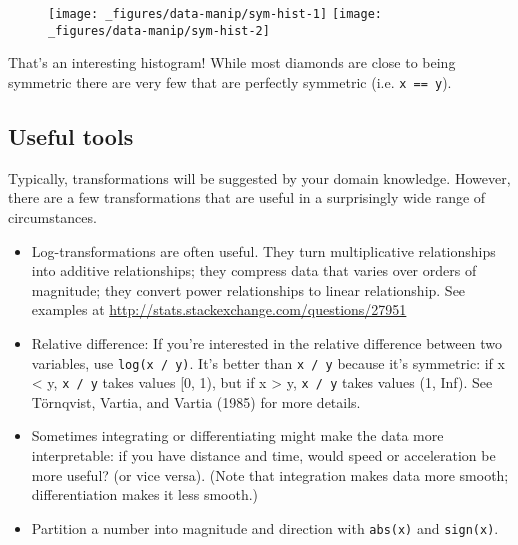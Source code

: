 \begin{Shaded}
\begin{Highlighting}[]
\NormalTok{(}\StringTok{ }
\StringTok{  }\NormalTok{(} \NormalTok{)}

\StringTok{ }\StringTok{ }\NormalTok{)}
\NormalTok{(}\StringTok{ }
\StringTok{  }\NormalTok{(} \NormalTok{)}
\end{Highlighting}
\end{Shaded}

\begin{figure}[H]
  \texttt{[image: \_figures/data-manip/sym-hist-1]}%
  \texttt{[image: \_figures/data-manip/sym-hist-2]}
\end{figure}

That's an interesting histogram! While most diamonds are close to being
symmetric there are very few that are perfectly symmetric (i.e.
\texttt{x\ ==\ y}).

\subsection{Useful tools}\label{useful-tools-1}

Typically, transformations will be suggested by your domain knowledge.
However, there are a few transformations that are useful in a
surprisingly wide range of circumstances.

\begin{itemize}
\item
  Log-transformations are often useful. They turn multiplicative
  relationships into additive relationships; they compress data that
  varies over orders of magnitude; they convert power relationships to
  linear relationship. See examples at
  \url{http://stats.stackexchange.com/questions/27951}
\item
  Relative difference: If you're interested in the relative difference
  between two variables, use \texttt{log(x\ /\ y)}. It's better than
  \texttt{x\ /\ y} because it's symmetric: if x \textless{} y,
  \texttt{x\ /\ y} takes values {[}0, 1), but if x \textgreater{} y,
  \texttt{x\ /\ y} takes values (1, Inf). See Törnqvist, Vartia, and
  Vartia (1985) for more details. 
\item
  Sometimes integrating or differentiating might make the data more
  interpretable: if you have distance and time, would speed or
  acceleration be more useful? (or vice versa). (Note that integration
  makes data more smooth; differentiation makes it less smooth.)
\item
  Partition a number into magnitude and direction with \texttt{abs(x)}
  and \texttt{sign(x)}.
\end{itemize}

